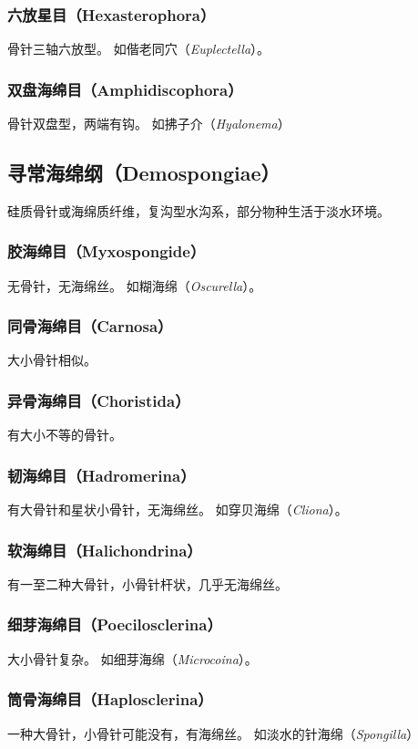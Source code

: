 \documentclass[11pt]{article}
\begin{document}
\subsubsection{六放星目（Hexasterophora）}
骨针三轴六放型。
如偕老同穴（\textit{Euplectella}）。

\subsubsection{双盘海绵目（Amphidiscophora）}
骨针双盘型，两端有钩。
如拂子介（\textit{Hyalonema}）

\subsection{寻常海绵纲（Demospongiae）}
硅质骨针或海绵质纤维，复沟型水沟系，部分物种生活于淡水环境。

\subsubsection{胶海绵目（Myxospongide）}
无骨针，无海绵丝。
如糊海绵（\textit{Oscurella}）。

\subsubsection{同骨海绵目（Carnosa）}
大小骨针相似。

\subsubsection{异骨海绵目（Choristida）}
有大小不等的骨针。

\subsubsection{韧海绵目（Hadromerina）}
有大骨针和星状小骨针，无海绵丝。
如穿贝海绵（\textit{Cliona}）。

\subsubsection{软海绵目（Halichondrina）}
有一至二种大骨针，小骨针杆状，几乎无海绵丝。

\subsubsection{细芽海绵目（Poecilosclerina）}
大小骨针复杂。
如细芽海绵（\textit{Microcoina}）。

\subsubsection{筒骨海绵目（Haplosclerina）}
一种大骨针，小骨针可能没有，有海绵丝。
如淡水的针海绵（\textit{Spongilla}）
  
\end{document}
